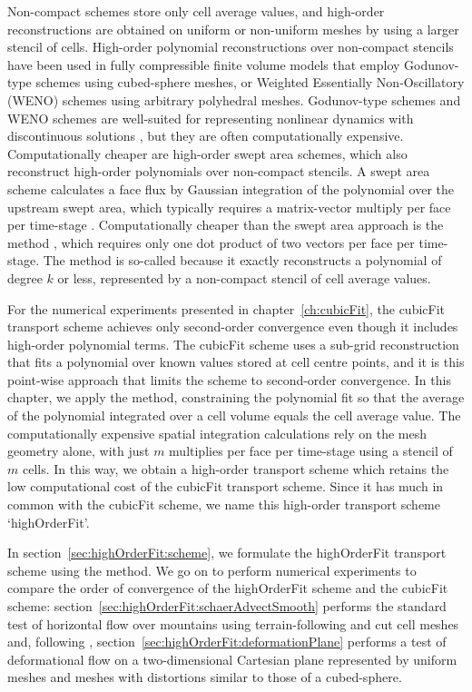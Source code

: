 Non-compact schemes store only cell average values, and high-order reconstructions are obtained on uniform or non-uniform meshes by using a larger stencil of cells.
High-order polynomial reconstructions over non-compact stencils have been used in fully compressible finite volume models that employ Godunov-type schemes \citep{ullrich-jablonowski2012} using cubed-sphere meshes, or Weighted Essentially Non-Oscillatory (WENO) schemes \citep{tsoutsanis-drikakis2016} using arbitrary polyhedral meshes.
Godunov-type schemes and WENO schemes are well-suited for representing nonlinear dynamics with discontinuous solutions \citep{leveque2002}, but they are often computationally expensive.
Computationally cheaper are high-order swept area schemes, which also reconstruct high-order polynomials over non-compact stencils.
A swept area scheme calculates a face flux by Gaussian integration of the polynomial over the upstream swept area, which typically requires a matrix-vector multiply per face per time-stage \citep{thuburn2014}.
Computationally cheaper than the swept area approach is the \kexact{} method \citep{barth1995}, which requires only one dot product of two vectors per face per time-stage.
The \kexact{} method is so-called because it exactly reconstructs a polynomial of degree $k$ or less, represented by a non-compact stencil of cell average values.

For the numerical experiments presented in chapter~\ref{ch:cubicFit}, the cubicFit transport scheme achieves only second-order convergence even though it includes high-order polynomial terms.
The cubicFit scheme uses a sub-grid reconstruction that fits a polynomial over known values stored at cell centre points, and it is this point-wise approach that limits the scheme to second-order convergence.
In this chapter, we apply the \kexact{} method, constraining the polynomial fit so that the average of the polynomial integrated over a cell volume equals the cell average value.
The computationally expensive spatial integration calculations rely on the mesh geometry alone, with just $m$ multiplies per face per time-stage using a stencil of $m$ cells.
In this way, we obtain a high-order transport scheme which retains the low computational cost of the cubicFit transport scheme.
Since it has much in common with the cubicFit scheme, we name this high-order transport scheme `highOrderFit'.

In section~\ref{sec:highOrderFit:scheme}, we formulate the highOrderFit transport scheme using the \kexact{} method.
We go on to perform numerical experiments to compare the order of convergence of the highOrderFit scheme and the cubicFit scheme: section~\ref{sec:highOrderFit:schaerAdvectSmooth} performs the standard test of horizontal flow over mountains using terrain-following and cut cell meshes and, following \citet{chen2017}, section~\ref{sec:highOrderFit:deformationPlane} performs a test of deformational flow on a two-dimensional Cartesian plane represented by uniform meshes and meshes with distortions similar to those of a cubed-sphere.





